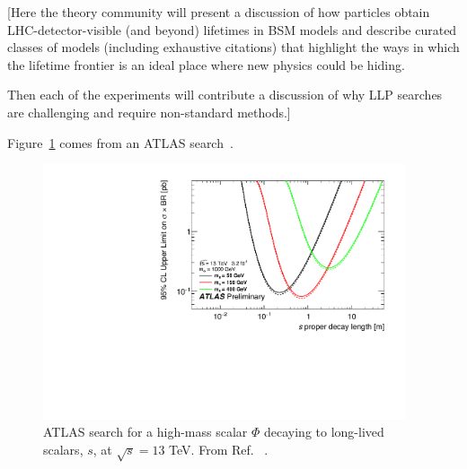 [Here the theory community will present a discussion of how particles obtain LHC-detector-visible (and beyond) lifetimes in BSM models and describe curated classes of models (including exhaustive citations) that highlight the ways in which the lifetime frontier is an ideal place where new physics could be hiding.

Then each of the experiments will contribute a discussion of why LLP searches are challenging and require non-standard methods.]

Figure~\ref{fig:ATLASCalRatio1} comes from an ATLAS search~\cite{ATLAS-CONF-2016-103}.

\begin{figure}
\centering
\includegraphics[width=0.95\textwidth]{figures/ATLAS_CalRatio_2016_m1TeV_fig_11c}
\caption{ATLAS search for a high-mass scalar $\Phi$ decaying to long-lived scalars, $s$, at $\sqrt{s} = 13$ TeV. From Ref. ~\cite{ATLAS-CONF-2016-103}.}
\label{fig:ATLASCalRatio1}
\end{figure}